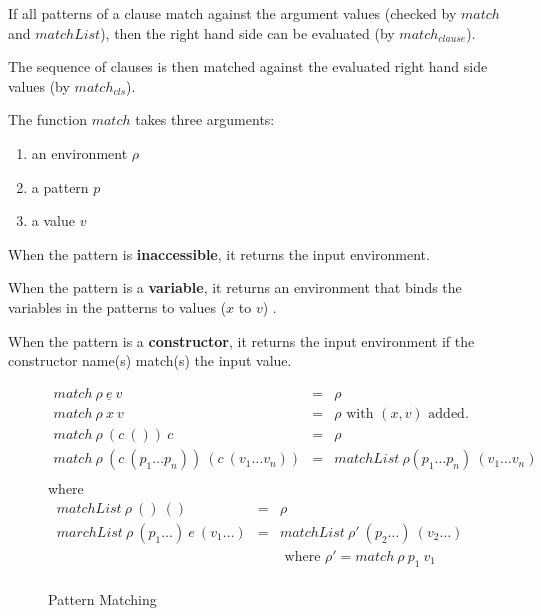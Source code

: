 If all patterns of a clause match against the argument values (checked by $match$ and $matchList$), then
the right hand side can be evaluated (by $match_{clause}$).

The sequence of clauses is then matched against the evaluated right hand side values (by $match_{cls}$).

The function $match$ takes three arguments:

\begin{enumerate}
  \item an environment $\rho$
  \item a pattern $p$
  \item a value $v$
\end{enumerate}

When the pattern is \textbf{inaccessible}, it returns the input environment.

When the pattern is a \textbf{variable}, it returns an environment that binds the variables in the patterns to values ($x$ to $v$) .

When the pattern is a \textbf{constructor}, it returns the input environment if the constructor name(s) match(s) the input value.

\begin{figure}[H]
  \begin{equation*}
    \begin{aligned}
      match \: \rho \: \underline{e} \: v                               & = & \rho                                                 \\
      match \: \rho \: x \: v                                           & = & \rho \textrm{ with } (x, v) \textrm{ added.}         \\
      match \: \rho \: (c \: ()) \: c                                   & = & \rho                                                 \\
      match \: \rho \: (c \: (p_1 \dots p_n)) \: (c \: (v_1 \dots v_n)) & = & matchList \: \rho (p_1 \dots p_n) \: (v_1 \dots v_n) \\
    \end{aligned}
  \end{equation*}
  \textrm{ where }
  \begin{equation*}
    \begin{aligned}
      matchList \: \rho \: () \: ()                        & = & \rho                                                                               \\
      marchList \: \rho \: (p_1 \dots) \: e \: (v_1 \dots) & = & matchList \: \rho' \:(p_2 \dots) \: (v_2 \dots)                                    \\
                                                           &   & \textrm{ where } \rho'                               = match \: \rho \: p_1 \: v_1 \\
    \end{aligned}
  \end{equation*}
  \caption{Pattern Matching}
\end{figure}

